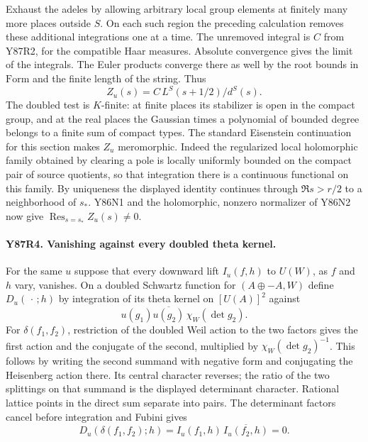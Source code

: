 Exhaust the adeles by allowing arbitrary local group elements at
finitely many more places outside $S$. On each such region the
preceding calculation removes these additional integrations one at
a time. The unremoved integral is $C$ from Y87R2, for the compatible
Haar measures. Absolute convergence gives the limit of the integrals.
The Euler products converge there as well by the root bounds in
$\mathrm{Form}$ and the finite length of the string. Thus
\[
                    Z_u(s)=C\,L^S(s+1/2)/d^S(s).
\]
The doubled test is $K$-finite: at finite places its stabilizer is open
in the compact group, and at the real places the Gaussian times a
polynomial of bounded degree belongs to a finite sum of compact
types. The standard Eisenstein continuation for this section
makes $Z_u$ meromorphic. Indeed the regularized local holomorphic
family obtained by clearing a pole is locally uniformly bounded
on the compact pair of source quotients, so that integration there
is a continuous functional on this family. By uniqueness the
displayed identity continues through $\Re s>r/2$ to a neighborhood
of $s_*$. Y86N1
and the holomorphic, nonzero normalizer of Y86N2 now give
$\operatorname{Res}_{s=s_*}Z_u(s)\ne0$.

\paragraph{Y87R4. Vanishing against every doubled theta kernel.}
For the same $u$ suppose that every downward lift $I_u(f,h)$ to
$U(W)$, as $f$ and $h$ vary, vanishes. On a doubled Schwartz
function for $(A\oplus -A,W)$ define $D_u(\,\cdot\,;h)$
by integration of its theta kernel on $[U(A)]^2$ against
\[
       u(g_1)\overline{u(g_2)}\,\chi_W(\det g_2).
\]
For $\delta(f_1,f_2)$, restriction of the doubled Weil action to
the two factors gives the first action and the conjugate of the
second, multiplied by $\chi_W(\det g_2)^{-1}$. This follows by
writing the second summand with negative form and conjugating the
Heisenberg action there. Its central character reverses; the ratio
of the two splittings on that summand is the displayed determinant
character. Rational lattice points in the direct sum separate into
pairs. The determinant factors cancel before integration and Fubini
gives
\[
       D_u(\delta(f_1,f_2);h)
          = I_u(f_1,h)\,\overline{I_u(f_2,h)}=0.
\]


